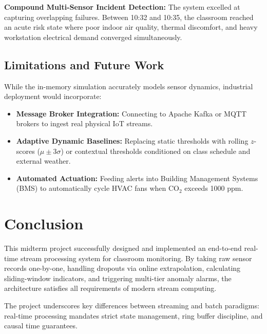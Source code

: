 \documentclass[12pt,a4paper]{article}
\begin{document}
\textbf{Compound Multi-Sensor Incident Detection:} The system excelled at capturing overlapping failures. Between 10:32 and 10:35, the classroom reached an acute risk state where poor indoor air quality, thermal discomfort, and heavy workstation electrical demand converged simultaneously.

\subsection{Limitations and Future Work}

While the in-memory simulation accurately models sensor dynamics, industrial deployment would incorporate:
\begin{itemize}
  \item \textbf{Message Broker Integration:} Connecting to Apache Kafka or MQTT brokers to ingest real physical IoT streams.
  \item \textbf{Adaptive Dynamic Baselines:} Replacing static thresholds with rolling $z$-scores ($\mu \pm 3\sigma$) or contextual thresholds conditioned on class schedule and external weather.
  \item \textbf{Automated Actuation:} Feeding alerts into Building Management Systems (BMS) to automatically cycle HVAC fans when $\text{CO}_2$ exceeds 1000 ppm.
\end{itemize}

\section{Conclusion}

This midterm project successfully designed and implemented an end-to-end real-time stream processing system for classroom monitoring. By taking raw sensor records one-by-one, handling dropouts via online extrapolation, calculating sliding-window indicators, and triggering multi-tier anomaly alarms, the architecture satisfies all requirements of modern stream computing.

The project underscores key differences between streaming and batch paradigms: real-time processing mandates strict state management, ring buffer discipline, and causal time guarantees.
\end{document}
